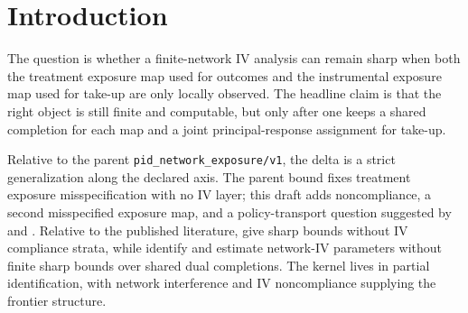 \documentclass[11pt]{article}
\theoremstyle{definition}
\theoremstyle{plain}
\theoremstyle{remark}
\begin{document}
\begin{abstract}
The parent banked result \texttt{pid\_network\_exposure/v1} gives sharp finite-network bounds for average direct effects when the treatment exposure map may be misspecified through one shared hidden completion. This proposal adds an IV layer: treatment may be taken up imperfectly, the instrumental exposure map may also be misspecified, and the target becomes the pair of complier direct and spillover effects in a finite network. The routine theorem is an exact finite identified-set representation obtained by enumerating shared outcome and instrument completions together with finite principal take-up tables, then optimizing bounded latent outcome means subject to the observed take-up and outcome moments. The flagship conjecture is a computable policy-transport frontier \(\mathcal T_g(P)\): a deterministic encouragement policy is transportable from cell-level complier effects if and only if its induced complier-cell share vector is constant over the feasible latent structures consistent with \(P\). A second conjecture gives a four-unit witness in which the parent bound survives as a corner case but policy transport fails once both exposure maps and compliance types are latent. Resolving these claims would connect exposure-mapping robustness to IV noncompliance without abandoning sharp finite-network partial identification.
\end{abstract}

\section{Introduction}
The question is whether a finite-network IV analysis can remain sharp when both the treatment exposure map used for outcomes and the instrumental exposure map used for take-up are only locally observed. The headline claim is that the right object is still finite and computable, but only after one keeps a shared completion for each map and a joint principal-response assignment for take-up.

Relative to the parent \texttt{pid\_network\_exposure/v1}, the delta is a strict generalization along the declared axis. The parent bound fixes treatment exposure misspecification with no IV layer; this draft adds noncompliance, a second misspecified exposure map, and a policy-transport question suggested by \citet{hoshino_yanagi_2024_noncompliance_unknown_interference} and \citet{nibbering_oosterveen_2025_iv_interference_policy}. Relative to the published literature, \citet{schroder_oprescu_feuerriegel_kallus_2026_networks_partialid} give sharp bounds without IV compliance strata, while \citet{hoshino_yanagi_2024_noncompliance_unknown_interference} identify and estimate network-IV parameters without finite sharp bounds over shared dual completions. The kernel lives in partial identification, with network interference and IV noncompliance supplying the frontier structure.
\end{document}
